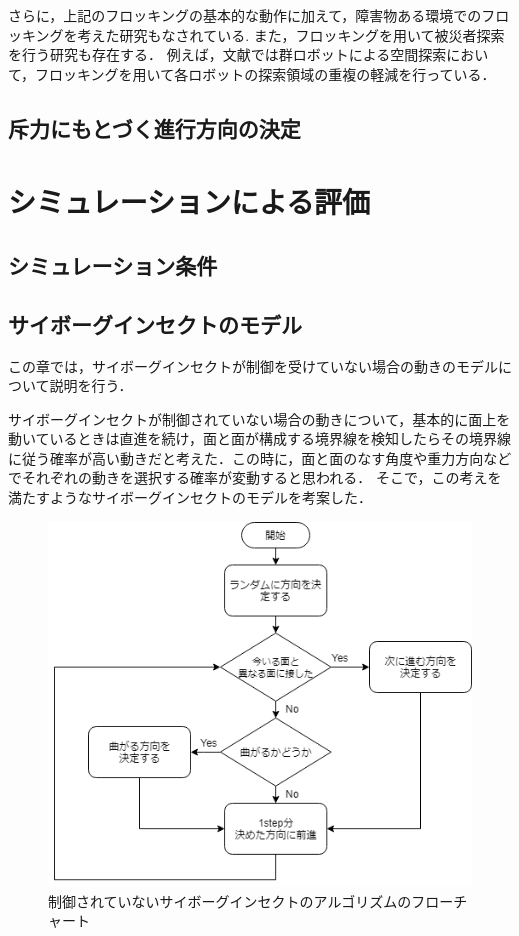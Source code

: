 \documentclass[a4paper,11pt]{jarticle}
\begin{document}
	さらに，上記のフロッキングの基本的な動作に加えて，障害物ある環境でのフロッキングを考えた研究もなされている\cite{obstacle}.
	また，フロッキングを用いて被災者探索を行う研究も存在する．
	例えば，文献\cite{exploration}では群ロボットによる空間探索において，フロッキングを用いて各ロボットの探索領域の重複の軽減を行っている．
	\subsection{斥力にもとづく進行方向の決定}
	\section{シミュレーションによる評価}
	\subsection{シミュレーション条件}
	\subsection{サイボーグインセクトのモデル}
	\label{sec:algorithm}
	この章では，サイボーグインセクトが制御を受けていない場合の動きのモデルについて説明を行う．
	
	サイボーグインセクトが制御されていない場合の動きについて，基本的に面上を動いているときは直進を続け，面と面が構成する境界線を検知したらその境界線に従う確率が高い動きだと考えた．この時に，面と面のなす角度や重力方向などでそれぞれの動きを選択する確率が変動すると思われる．
	そこで，この考えを満たすようなサイボーグインセクトのモデルを考案した．
	\begin{figure}
		\centering
		\includegraphics[width=0.7\linewidth]{png/Untitled.png}
		\caption[アルゴリズムのフローチャート]{制御されていないサイボーグインセクトのアルゴリズムのフローチャート}
		\label{fig:algorithm}
	\end{figure}
	
\end{document}
